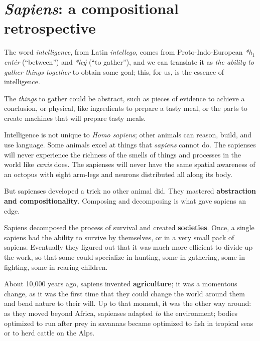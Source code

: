 
\section[Sapiens: a retrospective]{\emph{Sapiens}: a compositional retrospective}

\label{sec:brief-history}

The word \emph{intelligence}, from Latin \emph{intellego}, comes from Proto-Indo-European \emph{*h${}_1$entér} (``between'') and \emph{*leǵ} (``to gather''), and we can translate it as \emph{the ability to gather things together} to obtain some goal;
this, for us, is the essence of intelligence.

The \emph{things} to gather could be abstract, such as pieces of evidence to achieve a conclusion, or physical, like ingredients to prepare a tasty meal, or the parts to create machines that will prepare tasty meals.

Intelligence is not unique to \emph{Homo sapiens}; other animals can reason, build, and use language.
Some animals excel at things that \emph{sapiens} cannot do.
The sapienses will never experience the richness of the smells of things and processes in the world like \emph{canis} does.
The sapienses will never have the same spatial awareness of an octopus with eight arm-legs and neurons distributed all along its body.

But sapienses developed a trick no other animal did.
They mastered \textbf{abstraction and compositionality}.
Composing and decomposing is what gave sapiens an edge.


Sapiens decomposed the process of survival and created \textbf{societies}.
Once, a single sapiens had the ability to survive by themselves, or in a very small pack of sapiens.
Eventually they figured out that it was much more efficient to divide up the work, so that some could specialize in hunting, some in gathering, some in fighting, some in rearing children.

About 10,000 years ago, sapiens invented \textbf{agriculture}; it was a momentous change, as it was the first time that they could change the world around them and bend nature to their will.
Up to that moment, it was the other way around: as they moved beyond Africa, sapienses adapted \emph{to} the environment;
bodies optimized to run after prey in savannas became optimized to fish in tropical seas or to herd cattle on the Alps.

